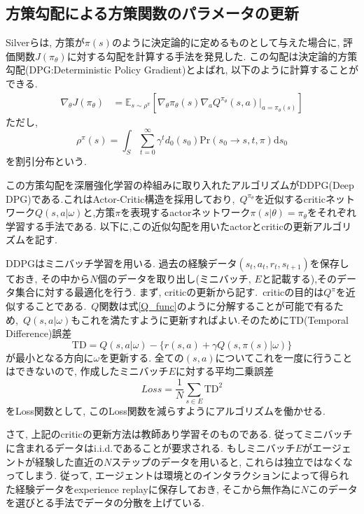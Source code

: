 \documentclass{jsarticle}
\newcommand{\expect}{\mathbb{E}}
\begin{document}
\subsection{方策勾配による方策関数のパラメータの更新}
Silverら\cite{DPG}は, 方策が$\pi(s)$のように決定論的に定めるものとして与えた場合に, 評価関数$J(\pi_{\theta})$に対する勾配を計算する手法を発見した. この勾配は決定論的方策勾配(DPG:Deterministic Policy Gradient)とよばれ, 以下のように計算することができる.
\begin{align}
	\nabla_{\theta}J(\pi_{\theta}) &= \expect_{s\sim\rho^{\pi}}[
	\nabla_{\theta}\pi_{\theta}(s)\nabla_{a}Q^{\pi_{\theta}}(s, a)|_{a=\pi_{\theta}(s)}] \label{true_pg} 
\end{align}
ただし, 
\begin{equation}
	\rho^{\pi}(s) = \int_{S}\sum_{t=0}^{\infty}\gamma^td_0(s_0)\textrm{Pr}(s_0\to s, t,  \pi)\textrm{d}s_0 \label{d_dis}
\end{equation}
を割引分布という.\par
この方策勾配を深層強化学習の枠組みに取り入れたアルゴリズムがDDPG(Deep DPG)\cite{DDPG}である.これはActor-Critic構造を採用しており,~$Q^{\pi_{\theta}}$を近似するcriticネットワーク$Q(s,a|\omega)$と,方策$\pi$を表現するactorネットワーク$\pi(s|\theta)=\pi_{\theta}$をそれぞれ学習する手法である. 以下に,この近似勾配を用いたactorとcriticの更新アルゴリズムを記す.\par
DDPGはミニバッチ学習を用いる. 過去の経験データ$(s_t, a_t, r_t, s_{t+1})$を保存しておき, その中から$N$個のデータを取り出し(ミニバッチ, $E$と記載する),そのデータ集合に対する最適化を行う. まず, criticの更新から記す.~criticの目的は$Q^{\pi}$を近似することである.~$Q$関数は式\eqref{Q_func}のように分解することが可能で有るため,~$Q(s,a|\omega)$もこれを満たすように更新すればよい.そのためにTD(Temporal Difference)誤差
\begin{equation}
	\textrm{TD} = Q(s,a|\omega) - \{r(s,a)+\gamma Q(s,\pi(s)|\omega)\}
\end{equation}
が最小となる方向に$\omega$を更新する. 全ての$(s,a)$についてこれを一度に行うことはできないので, 作成したミニバッチ$E$に対する平均二乗誤差
\begin{equation}
	Loss = \frac{1}{N}\sum_{s\in E} \textrm{TD}^2 \label{critic_loss}
\end{equation}
をLoss関数として, このLoss関数を減らすようにアルゴリズムを働かせる. \par
さて, 上記のcriticの更新方法は教師あり学習そのものである. 従ってミニバッチに含まれるデータはi.i.d.であることが要求される. もしミニバッチ$E$がエージェントが経験した直近の$N$ステップのデータを用いると, これらは独立ではなくなってしまう. 従って, エージェントは環境とのインタラクションによって得られた経験データをexperience replayに保存しておき, そこから無作為に$N$このデータを選びとる手法でデータの分散を上げている.\par
\end{document}
